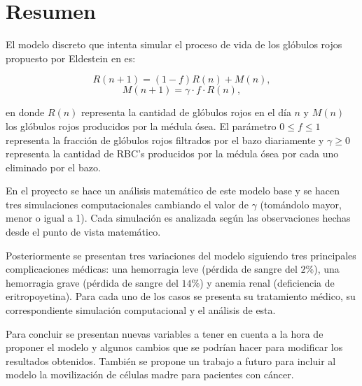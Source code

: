 \chapter*{Resumen}

El modelo discreto que intenta simular el proceso de vida de los glóbulos rojos propuesto por Eldestein en \cite{edelstein1988mathematical} es:

$$R(n+1)=(1-f)R(n)+M(n),$$
$$M(n+1)=\gamma \cdot f\cdot R(n),$$

en donde $R(n)$ representa la cantidad de glóbulos rojos en el día $n$ y $M(n)$ los glóbulos rojos producidos por la médula ósea. El parámetro $0\leq f \leq 1$ representa la fracción de glóbulos rojos filtrados por el bazo diariamente y $\gamma \geq 0$ representa la cantidad de RBC's producidos por la médula ósea por cada uno eliminado por el bazo. 

En el proyecto se hace un análisis matemático de este modelo base y se hacen tres simulaciones computacionales cambiando el valor de $\gamma$ (tomándolo mayor, menor o igual a 1). Cada simulación es analizada según las observaciones hechas desde el punto de vista matemático. 

Posteriormente se presentan tres variaciones del modelo siguiendo tres principales complicaciones médicas: una hemorragia leve (pérdida de sangre del $2\%$), una hemorragia grave (pérdida de sangre del $14\%$) y anemia renal (deficiencia de eritropoyetina). Para cada uno de los casos se presenta su tratamiento médico, su correspondiente simulación computacional y el análisis de esta. 

Para concluir se presentan nuevas variables a tener en cuenta a la hora de proponer el modelo y algunos cambios que se podrían hacer para modificar los resultados obtenidos. También se propone un trabajo a futuro para incluir al modelo la movilización de células madre para pacientes con cáncer.

